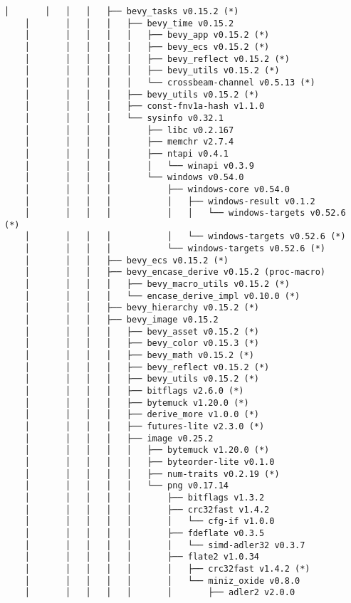 \begin{lstlisting}[style=mystyle, caption={dependencias del proyecto}, label={lst:dependencias}]
    │       │   │   │   ├── bevy_tasks v0.15.2 (*)
    │       │   │   │   ├── bevy_time v0.15.2
    │       │   │   │   │   ├── bevy_app v0.15.2 (*)
    │       │   │   │   │   ├── bevy_ecs v0.15.2 (*)
    │       │   │   │   │   ├── bevy_reflect v0.15.2 (*)
    │       │   │   │   │   ├── bevy_utils v0.15.2 (*)
    │       │   │   │   │   └── crossbeam-channel v0.5.13 (*)
    │       │   │   │   ├── bevy_utils v0.15.2 (*)
    │       │   │   │   ├── const-fnv1a-hash v1.1.0
    │       │   │   │   └── sysinfo v0.32.1
    │       │   │   │       ├── libc v0.2.167
    │       │   │   │       ├── memchr v2.7.4
    │       │   │   │       ├── ntapi v0.4.1
    │       │   │   │       │   └── winapi v0.3.9
    │       │   │   │       └── windows v0.54.0
    │       │   │   │           ├── windows-core v0.54.0
    │       │   │   │           │   ├── windows-result v0.1.2
    │       │   │   │           │   │   └── windows-targets v0.52.6 (*)
    │       │   │   │           │   └── windows-targets v0.52.6 (*)
    │       │   │   │           └── windows-targets v0.52.6 (*)
    │       │   │   ├── bevy_ecs v0.15.2 (*)
    │       │   │   ├── bevy_encase_derive v0.15.2 (proc-macro)
    │       │   │   │   ├── bevy_macro_utils v0.15.2 (*)
    │       │   │   │   └── encase_derive_impl v0.10.0 (*)
    │       │   │   ├── bevy_hierarchy v0.15.2 (*)
    │       │   │   ├── bevy_image v0.15.2
    │       │   │   │   ├── bevy_asset v0.15.2 (*)
    │       │   │   │   ├── bevy_color v0.15.3 (*)
    │       │   │   │   ├── bevy_math v0.15.2 (*)
    │       │   │   │   ├── bevy_reflect v0.15.2 (*)
    │       │   │   │   ├── bevy_utils v0.15.2 (*)
    │       │   │   │   ├── bitflags v2.6.0 (*)
    │       │   │   │   ├── bytemuck v1.20.0 (*)
    │       │   │   │   ├── derive_more v1.0.0 (*)
    │       │   │   │   ├── futures-lite v2.3.0 (*)
    │       │   │   │   ├── image v0.25.2
    │       │   │   │   │   ├── bytemuck v1.20.0 (*)
    │       │   │   │   │   ├── byteorder-lite v0.1.0
    │       │   │   │   │   ├── num-traits v0.2.19 (*)
    │       │   │   │   │   └── png v0.17.14
    │       │   │   │   │       ├── bitflags v1.3.2
    │       │   │   │   │       ├── crc32fast v1.4.2
    │       │   │   │   │       │   └── cfg-if v1.0.0
    │       │   │   │   │       ├── fdeflate v0.3.5
    │       │   │   │   │       │   └── simd-adler32 v0.3.7
    │       │   │   │   │       ├── flate2 v1.0.34
    │       │   │   │   │       │   ├── crc32fast v1.4.2 (*)
    │       │   │   │   │       │   └── miniz_oxide v0.8.0
    │       │   │   │   │       │       ├── adler2 v2.0.0

\end{lstlisting}

